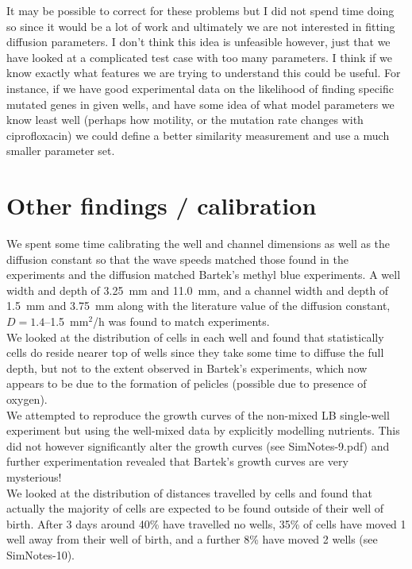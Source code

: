 \documentclass[a4paper,10pt]{article}
\begin{document}
It may be possible to correct for these problems but I did not spend time doing so since it would be a lot of work and ultimately we are not interested in fitting diffusion parameters.
I don't think this idea is unfeasible however, just that we have looked at a complicated test case with too many parameters.
I think if we know exactly what features we are trying to understand this could be useful. For instance, if we have good experimental
data on the likelihood of finding specific mutated genes in given wells, and have some idea of what model parameters we know least well (perhaps how motility,
or the mutation rate changes with ciprofloxacin) we could define a better similarity measurement and use a much smaller parameter set.
 

 
 
 
 
 \clearpage
 \newpage
 
\section{Other findings / calibration} 

We spent some time calibrating the well and channel dimensions as well as the diffusion constant so that the wave speeds matched those found in the experiments
and the diffusion matched Bartek's methyl blue experiments. A well width and depth of 3.25~mm and 11.0~mm, and a channel width and depth of 1.5~mm and 3.75~mm along with 
the literature value of the diffusion constant, $D=1.4$--1.5~mm$^2$/h was found to match experiments.\\

We looked at the distribution of cells in each well and found that statistically cells do reside nearer top of wells since they take some time to diffuse the full depth, 
but not to the extent observed in Bartek's experiments, which now appears to be due to the formation of pelicles (possible due to presence of oxygen).\\

We attempted to reproduce the growth curves of the non-mixed LB single-well experiment but using the well-mixed data by explicitly modelling nutrients. This
did not however significantly alter the growth curves (see SimNotes-9.pdf) and further experimentation revealed that Bartek's growth curves are
very mysterious!\\

We looked at the distribution of distances travelled by cells and found that actually the majority of cells are expected to be found outside of their well of birth. 
After 3 days around 40\% have travelled no wells, 35\% of cells have moved 1 well away from their well of birth, and a further 8\% have moved 2 wells
(see SimNotes-10).\\
\end{document}
